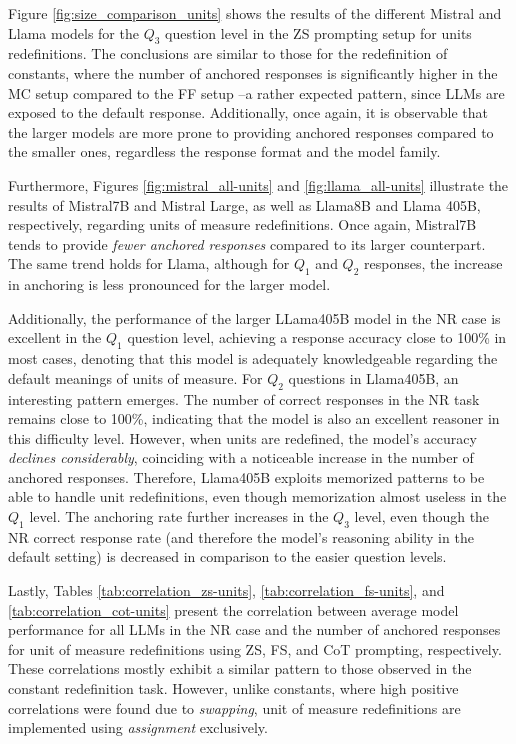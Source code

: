 


Figure \ref{fig:size_comparison_units} shows the results of the different Mistral and Llama models for the $Q_3$ question level in the ZS prompting setup for units redefinitions. The conclusions are similar to those for the redefinition of constants, where the number of anchored responses is significantly higher in the MC setup compared to the FF setup --a rather expected pattern, since LLMs are exposed to the default response. Additionally, once again, it is observable that the larger models are more prone to providing anchored responses compared to the smaller ones, regardless the response format and the model family.

Furthermore, Figures \ref{fig:mistral_all-units} and \ref{fig:llama_all-units} illustrate the results of Mistral7B and Mistral Large, as well as Llama8B and Llama 405B, respectively, regarding units of measure redefinitions. Once again, Mistral7B tends to provide \textit{fewer anchored responses} compared to its larger counterpart. The same trend holds for Llama, although for $Q_1$ and $Q_2$ responses, the increase in anchoring is less pronounced for the larger model. 

Additionally, the performance of the larger LLama405B model in the NR case is excellent in the $Q_1$  question level, achieving a response accuracy close to 100\% in most cases, denoting that this model is adequately knowledgeable regarding the default meanings of units of measure. For $Q_2$ questions in Llama405B, an interesting pattern emerges. The number of correct responses in the NR task remains close to 100\%, indicating that the model is also an excellent reasoner in this difficulty level. However, when units are redefined, the model's accuracy \textit{declines considerably}, coinciding with a noticeable increase in the number of anchored responses. Therefore, Llama405B exploits memorized patterns to be able to handle unit redefinitions, even though memorization almost useless in the $Q_1$ level. The anchoring rate further increases in the $Q_3$ level, even though the NR correct response rate (and therefore the model's reasoning ability in the default setting) is decreased in comparison to the easier question levels.

Lastly, Tables \ref{tab:correlation_zs-units}, \ref{tab:correlation_fs-units}, and \ref{tab:correlation_cot-units} present the correlation between average model performance for all LLMs in the NR case and the number of anchored responses for unit of measure redefinitions using ZS, FS, and CoT prompting, respectively. These correlations mostly exhibit a similar pattern to those observed in the constant redefinition task. However, unlike constants, where high positive correlations were found due to \textit{swapping}, unit of measure redefinitions are implemented using  \textit{assignment} exclusively. 

